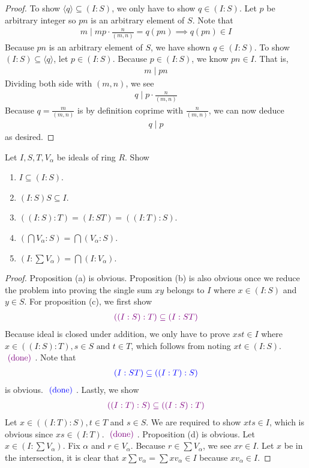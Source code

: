\documentclass{report}
\begin{document}
\begin{proof}
To show $\langle q\rangle \subseteq (I:S)$, we only have to show $q \in (I:S)$. Let $p$ be arbitrary integer so $pn$ is an arbitrary element of  $S$. Note that 
\begin{align*}
m \mid mp \cdot \frac{n}{(m,n)} =  q (pn) \implies  q(pn) \in I
\end{align*}
Because $pn$ is an arbitrary element of  $S$, we have shown  $q\in (I:S)$. To show $(I:S)\subseteq \langle q\rangle $, let $p \in (I:S)$. Because $p \in (I:S)$, we know $pn\in I$. That is, 
\begin{align*}
m \mid  pn
\end{align*}
Dividing both side with $(m,n)$, we see  
\begin{align*}
q \mid p \cdot \frac{n}{(m,n)} 
\end{align*}
Because $q= \frac{m}{(m,n)}$ is by definition coprime with $\frac{n}{(m,n)}$, we can now deduce 
\begin{align*}
q \mid p 
\end{align*}
as desired.
\end{proof}
\begin{question}{}{}
Let $I,S,T,V_\alpha $ be ideals of ring $R$. Show 
\begin{enumerate}[label=(\alph*)]
  \item $I \subseteq (I:S)$. 
  \item $(I:S)S \subseteq I$. 
  \item $((I:S):T)=(I:ST)=((I:T):S)$. 
  \item $(\bigcap  V_\alpha : S)= \bigcap  (V_\alpha :S)$. 
  \item $(I: \sum V_\alpha )=\bigcap (I:V_\alpha )$. 
\end{enumerate}
\end{question}
\begin{proof}
Proposition (a) is obvious. Proposition (b) is also obvious once we reduce the problem into proving the single sum $xy$ belongs to  $I$ where  $x\in (I:S)$ and $y \in S$. For proposition (c), we first show 
\begin{align*}
\textcolor{violet}{((I:S):T)\subseteq (I:ST)}
\end{align*}
Because ideal is closed under addition, we only have to prove $xst\in I$ where $x\in ((I:S):T), s \in S\text{ and } t \in T$, which follows from noting $xt \in (I:S)$. $\textcolor{violet}{\text{ (done) }}$. Note that  
\begin{align*}
\textcolor{blue}{(I:ST)\subseteq ((I:T):S)}
\end{align*}
is obvious. $\textcolor{blue}{\text{ (done) }}$. Lastly, we show 
\begin{align*}
\textcolor{violet}{((I:T):S)\subseteq ((I:S):T)}
\end{align*}
Let $x\in ((I:T):S),t\in T$ and $s \in S$. We are required to show $xts \in I$, which is obvious since $xs \in (I:T)$. $\textcolor{violet}{\text{ (done) }}$. Proposition (d) is obvious.  Let $x \in (I: \sum V_\alpha )$. Fix $\alpha $ and $r \in V_\alpha $. Because $r\in \sum V_\alpha $, we see $xr\in I$. Let $x$ be in the intersection, it is clear that $x \sum v_\alpha =\sum xv_\alpha \in I$ because $xv_\alpha \in I$.     
\end{proof}
\end{document}
